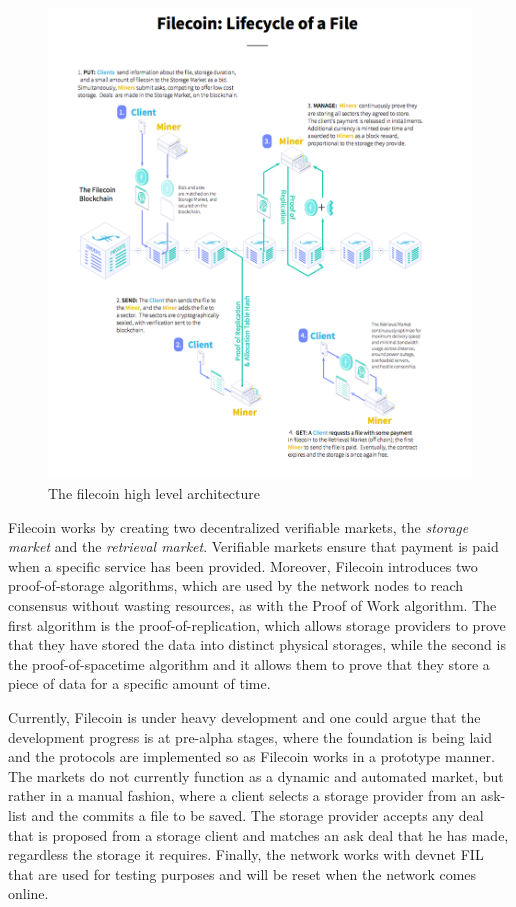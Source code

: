 \begin{figure}[h]
    \centering
    \includegraphics[width=1\textwidth]{images/filecoin.png}
    \caption{The filecoin high level architecture \cite{filecoin-primer}}
    \label{fig:filecoin}
\end{figure}
\clearpage

Filecoin works by creating two decentralized verifiable markets, the \textit{storage market} and the \textit{retrieval market}. Verifiable markets ensure that payment is paid when a specific service has been provided. Moreover, Filecoin introduces two proof-of-storage algorithms, which are used by the network nodes to reach consensus without wasting resources, as with the Proof of Work algorithm. The first algorithm is the proof-of-replication, which allows storage providers to prove that they have stored the data into distinct physical storages, while the second is the proof-of-spacetime algorithm and it allows them to prove that they store a piece of data for a specific amount of time. 

Currently, Filecoin is under heavy development and one could argue that the development progress is at pre-alpha stages, where the foundation is being laid and the protocols are implemented so as Filecoin works in a prototype manner. The markets do not currently function as a dynamic and automated market, but rather in a manual fashion, where a client selects a storage provider from an ask-list and the commits a file to be saved. The storage provider accepts any deal that is proposed from a storage client and matches an ask deal that he has made, regardless the storage it requires. Finally, the network works with devnet FIL that are used for testing purposes and will be reset when the network comes online.

